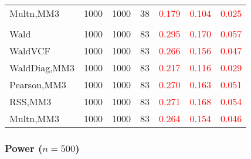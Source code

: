 \documentclass[
]{article}
\begin{document}
\begin{table}[H]
{\begin{tabular}[t]{lrrrrrr}
\hspace{1em}Multn,MM3 & 1000 & 1000 & 38 & \textcolor{red}{0.179} & \textcolor{red}{0.104} & \textcolor{red}{0.025}\\
\addlinespace[0.3em]
\multicolumn{7}{l}{\textbf{3F 15V}}\\
\hspace{1em}Wald & 1000 & 1000 & 83 & \textcolor{red}{0.295} & \textcolor{red}{0.170} & \textcolor{red}{0.057}\\
\hspace{1em}WaldVCF & 1000 & 1000 & 83 & \textcolor{red}{0.266} & \textcolor{red}{0.156} & \textcolor{red}{0.047}\\
\hspace{1em}WaldDiag,MM3 & 1000 & 1000 & 83 & \textcolor{red}{0.217} & \textcolor{red}{0.116} & \textcolor{red}{0.029}\\
\hspace{1em}Pearson,MM3 & 1000 & 1000 & 83 & \textcolor{red}{0.270} & \textcolor{red}{0.163} & \textcolor{red}{0.051}\\
\hspace{1em}RSS,MM3 & 1000 & 1000 & 83 & \textcolor{red}{0.271} & \textcolor{red}{0.168} & \textcolor{red}{0.054}\\
\hspace{1em}Multn,MM3 & 1000 & 1000 & 83 & \textcolor{red}{0.264} & \textcolor{red}{0.154} & \textcolor{red}{0.046}\\
\bottomrule
\end{tabular}}
\endgroup{}
\end{table}

\subsubsection{\texorpdfstring{Power
(\(n=500\))}{Power (n=500)}}\label{power-n500-1}
\end{document}

